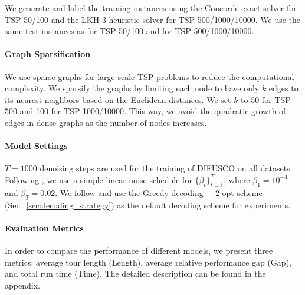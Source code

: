 \documentclass{article}
\theoremstyle{plain}
\theoremstyle{definition}
\theoremstyle{remark}
\newcommand{\method}{DIFUSCO}
\begin{document}
We generate and label the training instances using the Concorde exact solver \citep{applegate2006concorde} for TSP-50/100 and the LKH-3 heuristic solver \citep{lkh3} for TSP-500/1000/10000. We use the same test instances as \citep{joshi2022learning,19iclr-am} for TSP-50/100 and \citep{fu2021generalize} for TSP-500/1000/10000.

\paragraph{Graph Sparsification}

We use sparse graphs for large-scale TSP problems to reduce the computational complexity. We sparsify the graphs by limiting each node to have only $k$ edges to its nearest neighbors based on the Euclidean distances. We set $k$ to 50 for TSP-500 and 100 for TSP-1000/10000. This way, we avoid the quadratic growth of edges in dense graphs as the number of nodes increases.

\paragraph{Model Settings}
$T=1000$ denoising steps are used for the training of \method{} on all datasets. Following \citet{ho2020denoising,graikos2022diffusion}, we use a simple linear noise schedule for $\{\beta_t\}_{t=1}^{T}$, where $\beta_1 = 10^{-4}$ and $\beta_T = 0.02$. We follow \citet{graikos2022diffusion} and use the Greedy decoding + 2-opt scheme (Sec.~\ref{sec:decoding_strategy}) as the default decoding scheme for experiments.

\paragraph{Evaluation Metrics}
In order to compare the performance of different models, we present three metrics: average tour length (Length), average relative performance gap (Gap), and total run time (Time). The detailed description can be found in the appendix.


\setcounter{figure}{0}
\end{document}

